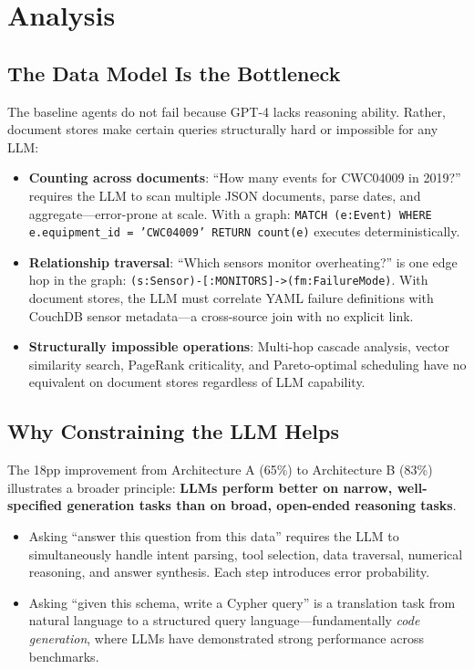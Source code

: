 \documentclass[11pt]{article}
\begin{document}
\section{Analysis}
\label{sec:analysis}

\subsection{The Data Model Is the Bottleneck}

The baseline agents do not fail because GPT-4 lacks reasoning ability. Rather, document stores make certain queries structurally hard or impossible for any LLM:

\begin{itemize}[leftmargin=*]
  \item \textbf{Counting across documents}: ``How many events for CWC04009 in 2019?'' requires the LLM to scan multiple JSON documents, parse dates, and aggregate---error-prone at scale. With a graph: \texttt{MATCH (e:Event) WHERE e.equipment\_id = 'CWC04009' RETURN count(e)} executes deterministically.

  \item \textbf{Relationship traversal}: ``Which sensors monitor overheating?'' is one edge hop in the graph: \texttt{(s:Sensor)-[:MONITORS]->(fm:FailureMode)}. With document stores, the LLM must correlate YAML failure definitions with CouchDB sensor metadata---a cross-source join with no explicit link.

  \item \textbf{Structurally impossible operations}: Multi-hop cascade analysis, vector similarity search, PageRank criticality, and Pareto-optimal scheduling have no equivalent on document stores regardless of LLM capability.
\end{itemize}

\subsection{Why Constraining the LLM Helps}

The 18pp improvement from Architecture A (65\%) to Architecture B (83\%) illustrates a broader principle: \textbf{LLMs perform better on narrow, well-specified generation tasks than on broad, open-ended reasoning tasks}.

\begin{itemize}[leftmargin=*]
  \item Asking ``answer this question from this data'' requires the LLM to simultaneously handle intent parsing, tool selection, data traversal, numerical reasoning, and answer synthesis. Each step introduces error probability.
  \item Asking ``given this schema, write a Cypher query'' is a translation task from natural language to a structured query language---fundamentally \emph{code generation}, where LLMs have demonstrated strong performance across benchmarks.
\end{itemize}
\end{document}
